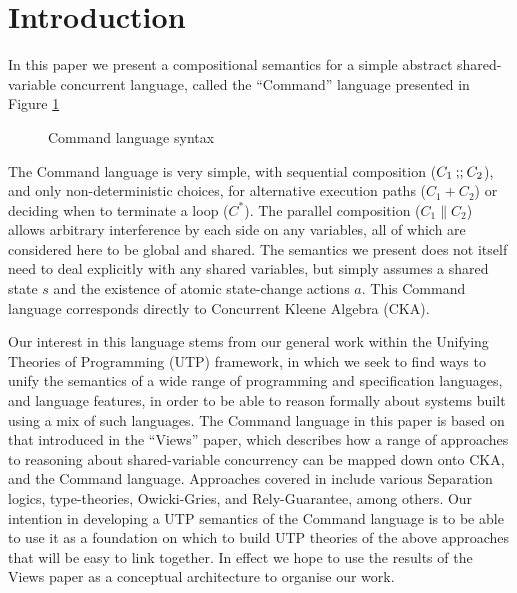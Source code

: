 \section{Introduction}\label{sec:Intro}

In this paper we present a compositional semantics
for a simple abstract shared-variable concurrent language,
called the ``Command'' language
presented in Figure \ref{fig:cmd-syntax}
\begin{figure}
    \caption{Command language syntax}
  \label{fig:cmd-syntax}
\end{figure}
The Command language is very simple,
with sequential composition ($C_1 \mathbin{;\!;} C_2$),
and only non-deterministic choices,
for alternative execution paths ($C_1 + C_2$)
or deciding when to terminate a loop ($C^*$).
The parallel composition ($C_1 \parallel C_2$)
allows arbitrary interference by each side on any variables,
all of which are considered here to be global and shared.
The semantics we present does not itself need to deal explicitly
with any shared variables,
but simply assumes a shared state $s$
and the existence of atomic state-change actions $a$.
This Command language corresponds directly
to Concurrent Kleene Algebra (CKA)\cite{Hoare2009}.

Our interest in this language stems from our general work within
the Unifying Theories of Programming (UTP) framework\cite{Hoare-He98},
in which we seek to find ways to unify the semantics of a wide range of programming and specification languages, and language features,
in order to be able to reason formally about systems built using a mix of such languages.
The Command language in this paper is based on that introduced in the
``Views'' paper\cite{conf/popl/Dinsdale-YoungBGPY13},
which describes how a range of approaches to reasoning about shared-variable concurrency can be mapped down onto CKA,
and the Command language.
Approaches covered in \cite{conf/popl/Dinsdale-YoungBGPY13} include
various Separation logics\cite{conf/lics/CalcagnoOY07}, type-theories, Owicki-Gries\cite{DBLP:journals/acta/OwickiG76},
and Rely-Guarantee\cite{DBLP:journals/toplas/Jones83}, among others.
Our intention in developing a UTP semantics of the Command language
is to be able to use it as a foundation on which to build UTP
theories of the above approaches that will be easy to link together.
In effect we hope to use the results of the Views paper as a
conceptual architecture to organise our work.

